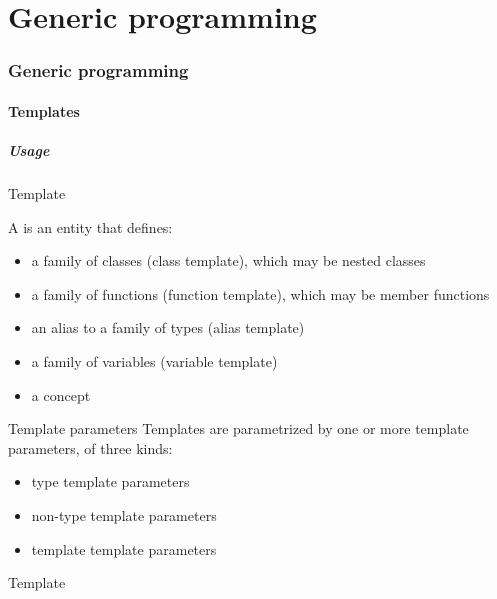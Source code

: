 \part{Generic programming}

\section{Generic programming}

\subsection{Templates}

\subsubsection{Usage}

\begin{frame}{Template}{}
  \begin{definition}[Template]
    A  is an entity that defines:
    \begin{itemize}
    \item
      a family of classes (class template), which may be nested classes
    \item
      a family of functions (function template), which may be member functions
    \item
      an alias to a family of types (alias template)
    \item
      a family of variables (variable template)
    \item
      a concept
    \end{itemize}
  \end{definition}

  \begin{block}{Template parameters}
    Templates are parametrized by one or more template parameters, of three kinds:
    \begin{itemize}
    \item
      type template parameters
    \item
      non-type template parameters
    \item
      template template parameters
    \end{itemize}
  \end{block}
\end{frame}

\begin{frame}{Template}{}
  \begin{example}[Template]
  \end{example}
\end{frame}

